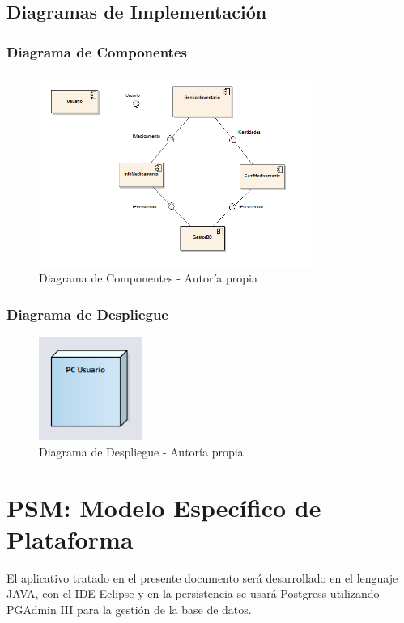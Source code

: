 \subsection{ Diagramas de Implementación}
\subsubsection{ Diagrama de Componentes}
\begin{center}
    \begin{figure}[htb]
        \centering
        \includegraphics[width = 0.8\textwidth] {libro/capitulo5/img/Componentes.PNG}
        \caption{Diagrama de Componentes - Autor\'ia propia}
        \label{fig:my_label}
    \end{figure}
\end{center}
\subsubsection{Diagrama de Despliegue}

\begin{center}
    \begin{figure}[htb]
        \centering
        \includegraphics[width = 0.3\textwidth] {libro/capitulo5/img/Despliegue.PNG}
        \caption{Diagrama de Despliegue - Autor\'ia propia}
        \label{fig:my_label}
    \end{figure}
\end{center}

\section{PSM: Modelo Específico de Plataforma}

El aplicativo tratado en el presente documento ser\'a desarrollado en el lenguaje JAVA, con el IDE Eclipse y en la persistencia se usar\'a Postgress utilizando PGAdmin III para la gesti\'on de la base de datos.
